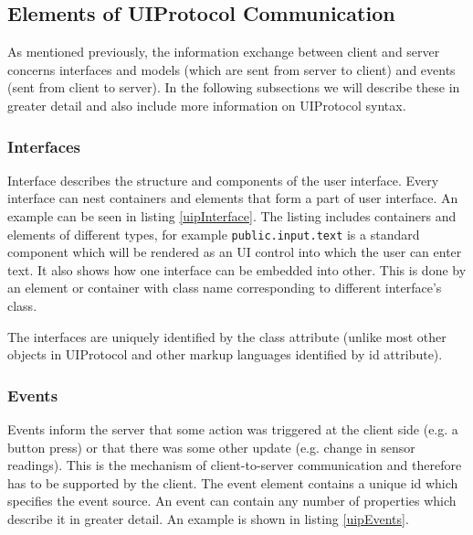 



\subsection{Elements of UIProtocol Communication}
As mentioned previously, the information exchange between client and server concerns interfaces and models (which are sent from server to client) and events (sent from client to server). In the following subsections we will describe these in greater detail and also include more information on UIProtocol syntax.

\subsubsection{Interfaces}
Interface describes the structure and components of the user interface. Every interface can nest containers and elements that form a part of user interface. An example can be seen in listing \ref{uipInterface}. The listing includes containers and elements of different types, for example \texttt{public.input.text} is a standard component which will be rendered as an UI control into which the user can enter text. It also shows how one interface can be embedded into other. This is done by an element or container with class name corresponding to different interface's class.

The interfaces are uniquely identified by the class attribute (unlike most other objects in UIProtocol and other markup languages identified by id attribute).



\subsubsection{Events}
Events inform the server that some action was triggered at the client side (e.g. a button press) or that there was some other update (e.g. change in sensor readings). This is the mechanism of client-to-server communication and therefore has to be supported by the client. The event element contains a unique id which specifies the event source. An event can contain any number of properties which describe it in greater detail. An example is shown in listing \ref{uipEvents}.


